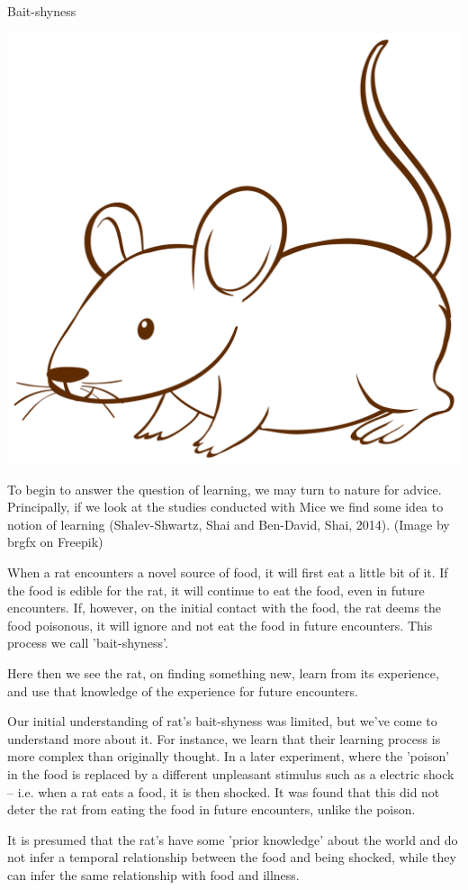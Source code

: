 \documentclass[10pt]{beamer}
\begin{document}
\begin{frame}[label={sec:orgf62d368}]{Bait-shyness}
\begin{center}
\includegraphics[height=0.7\textheight]{images/rat.jpg}
\end{center}

To begin to answer the question of learning, we may turn to nature for
advice. Principally, if we look at the studies conducted with Mice we find some idea
to notion of learning (Shalev-Shwartz, Shai and Ben-David, Shai, 2014). (Image by brgfx on Freepik)

When a rat encounters a novel source of food, it will first eat a little bit of
it. If the food is edible for the rat, it will continue to eat the food, even in
future encounters. If, however, on the initial contact with the food, the rat deems
the food poisonous, it will ignore and not eat the food in future encounters. This
process we call 'bait-shyness'.

Here then we see the rat, on finding something new, learn from its experience, and
use that knowledge of the experience for future encounters.

Our initial understanding of rat's bait-shyness was limited, but we've come to
understand more about it. For instance, we learn that their learning process is more
complex than originally thought. In a later experiment, where the 'poison' in the
food is replaced by a different unpleasant stimulus such as a electric shock --
i.e. when a rat eats a food, it is then shocked. It was found that this did not
deter the rat from eating the food in future encounters, unlike the poison.

It is presumed that the rat's have some 'prior knowledge' about the world and do not
infer a temporal relationship between the food and being shocked, while they can
infer the same relationship with food and illness.
\end{frame}
\end{document}
